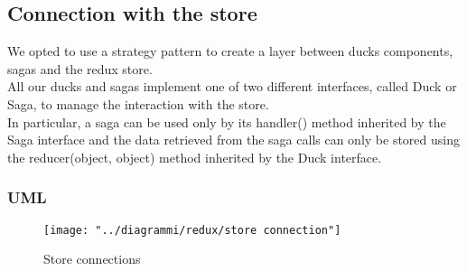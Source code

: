 \documentclass[../redux]{subfiles}
\begin{document}
	\subsection{Connection with the store}
	We opted to use a strategy pattern to create a layer between ducks components, sagas and the redux store.\\
	All our ducks and sagas implement one of two different interfaces, called Duck or Saga, to manage the interaction with the store.\\
	In particular, a saga can be used only by its handler() method inherited by the Saga interface
	and the data retrieved from the saga calls can only be stored using the reducer(object, object) method inherited by the Duck interface.
	\subsubsection{UML}
	\begin{figure}[H]
		\centering
		\texttt{[image: "../diagrammi/redux/store connection"]}
		\caption{Store connections}
		\label{fig:Store connections}
	\end{figure}
	
\end{document}
